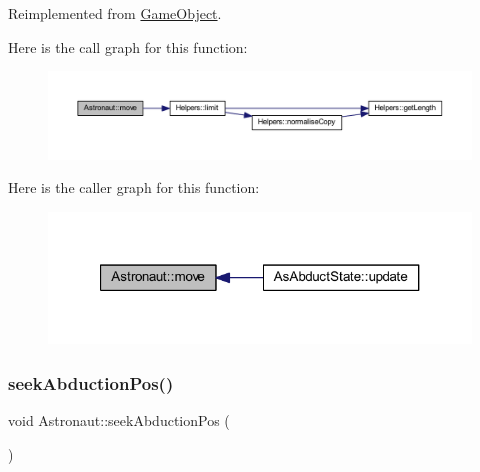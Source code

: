 Reimplemented from \hyperlink{class_game_object_abebe08f70e334c52b8bf052b6ef8c6f3}{Game\+Object}.

Here is the call graph for this function\+:
\nopagebreak
\begin{figure}[H]
\begin{center}
\leavevmode
\includegraphics[width=350pt]{class_astronaut_a763eea389d50440a049cd16d92c7c694_cgraph}
\end{center}
\end{figure}
Here is the caller graph for this function\+:
\nopagebreak
\begin{figure}[H]
\begin{center}
\leavevmode
\includegraphics[width=321pt]{class_astronaut_a763eea389d50440a049cd16d92c7c694_icgraph}
\end{center}
\end{figure}
\mbox{\label{class_astronaut_aa9f03535d8f48b807838d28885904e59}} 
\subsubsection{\texorpdfstring{seek\+Abduction\+Pos()}{seekAbductionPos()}}
{\footnotesize\ttfamily void Astronaut\+::seek\+Abduction\+Pos (\begin{DoxyParamCaption}{ }\end{DoxyParamCaption})}

